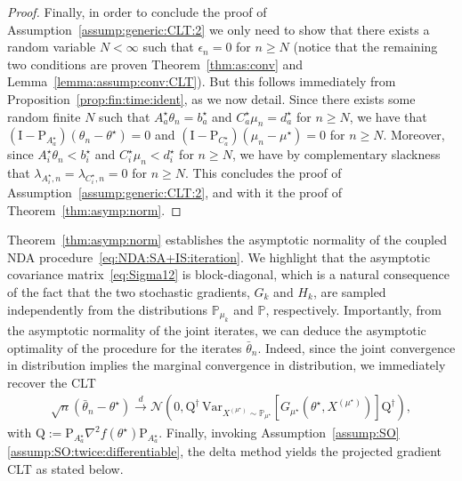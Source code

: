 \documentclass[11pt,a4paper]{article}
\theoremstyle{definition}
\begin{document}
\begin{proof}
Finally, in order to conclude the proof of Assumption~\ref{assump:generic:CLT:2} we only need to show that there exists a random variable $N < \infty$ such that $\epsilon_n = 0$ for $n \geq N$ (notice that the remaining two conditions are proven Theorem~\ref{thm:as:conv} and Lemma~\ref{lemma:assump:conv:CLT}). But this follows immediately from Proposition~\ref{prop:fin:time:ident}, as we now detail. Since there exists some random finite $N$ such that $A^\star_{a} \theta_n = b^\star_a$ and $C^\star_{a} \mu_n = d^\star_a$ for $n \geq N$, we have that $(\text{I}- \text{P}_{A^\star_a}) (\theta_{n} - \theta^\star) = 0$ and $(\text{I}- \text{P}_{C^\star_a})(\mu_{n}-\mu^\star) = 0$ for $n \geq N$. Moreover, since $A^\star_{i} \theta_n < b^\star_i$ and $C^\star_{i} \mu_n < d^\star_i$ for $n \geq N$, we have by complementary slackness that $\lambda_{A^\star_i,n} = \lambda_{C^\star_i,n} = 0$ for $n \geq N$. This concludes the proof of Assumption~\ref{assump:generic:CLT:2}, and with it the proof of Theorem~\ref{thm:asymp:norm}.
\end{proof}

Theorem~\ref{thm:asymp:norm} establishes the asymptotic normality of the coupled NDA procedure~\eqref{eq:NDA:SA+IS:iteration}. We highlight that the asymptotic covariance matrix~\eqref{eq:Sigma12} is block-diagonal, which is a natural consequence of the fact that the two stochastic gradients, $G_k$ and $H_k$, are sampled independently from the distributions $\mathbb P_{\mu_k}$ and $\mathbb P$, respectively. Importantly, from the asymptotic normality of the joint iterates, we can deduce the asymptotic optimality of the procedure for the iterates $\bar{\theta}_n$. Indeed, since the joint convergence in distribution implies the marginal convergence in distribution, we immediately recover the CLT
\begin{align*}
    \sqrt{n}\left( \bar{\theta}_n - \theta^\star \right) \overset{d}{\to} \mathcal N \left(0, \text{Q}^{\dagger}\, \text{Var}_{X^{(\mu^\star)} \sim \mathbb P_{\mu^\star}}\left[G_{\mu^\star}(\theta^\star, X^{(\mu^\star)})\right] \text{Q}^{\dagger} \right),
\end{align*}
with $\text{Q}:=\text{P}_{A^\star_{a}}\nabla^2  f(\theta^\star) \text{P}_{A^\star_{a}}$. Finally, invoking Assumption~\ref{assump:SO}\ref{assump:SO:twice:differentiable}, the delta method yields the projected gradient CLT as stated below.
\end{document}
